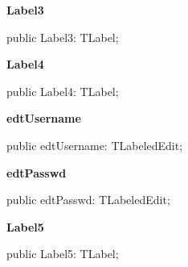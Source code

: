 \documentclass{report}
\newif\ifpdf
\begin{document}
\begin{list}{}
\par  \label{settings.TForm2-Label3}
\item[\textbf{Label3}\hfill]
\ifpdf
\begin{flushleft}
\fi
\begin{ttfamily}
public Label3: TLabel;\end{ttfamily}

\ifpdf
\end{flushleft}
\fi


\par  \label{settings.TForm2-Label4}
\item[\textbf{Label4}\hfill]
\ifpdf
\begin{flushleft}
\fi
\begin{ttfamily}
public Label4: TLabel;\end{ttfamily}

\ifpdf
\end{flushleft}
\fi


\par  \label{settings.TForm2-edtUsername}
\item[\textbf{edtUsername}\hfill]
\ifpdf
\begin{flushleft}
\fi
\begin{ttfamily}
public edtUsername: TLabeledEdit;\end{ttfamily}

\ifpdf
\end{flushleft}
\fi


\par  \label{settings.TForm2-edtPasswd}
\item[\textbf{edtPasswd}\hfill]
\ifpdf
\begin{flushleft}
\fi
\begin{ttfamily}
public edtPasswd: TLabeledEdit;\end{ttfamily}

\ifpdf
\end{flushleft}
\fi


\par  \label{settings.TForm2-Label5}
\item[\textbf{Label5}\hfill]
\ifpdf
\begin{flushleft}
\fi
\begin{ttfamily}
public Label5: TLabel;\end{ttfamily}

\ifpdf
\end{flushleft}
\fi



\end{list}
\end{document}
